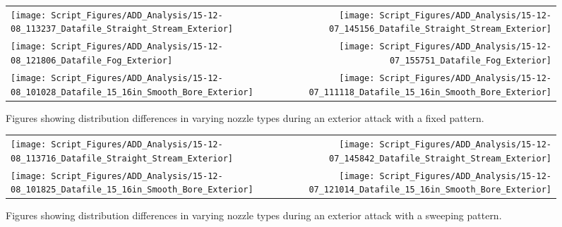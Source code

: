 \documentclass{article}
\begin{document}
\clearpage




\begin{figure}[ht]
\begin{tabular*}{\textwidth}{lr}
\texttt{[image: Script\_Figures/ADD\_Analysis/15-12-08\_113237\_Datafile\_Straight\_Stream\_Exterior]} &
\texttt{[image: Script\_Figures/ADD\_Analysis/15-12-07\_145156\_Datafile\_Straight\_Stream\_Exterior]} \\
\texttt{[image: Script\_Figures/ADD\_Analysis/15-12-08\_121806\_Datafile\_Fog\_Exterior]} &
\texttt{[image: Script\_Figures/ADD\_Analysis/15-12-07\_155751\_Datafile\_Fog\_Exterior]} \\
\texttt{[image: Script\_Figures/ADD\_Analysis/15-12-08\_101028\_Datafile\_15\_16in\_Smooth\_Bore\_Exterior]} & 
\texttt{[image: Script\_Figures/ADD\_Analysis/15-12-07\_111118\_Datafile\_15\_16in\_Smooth\_Bore\_Exterior]} \\
\end{tabular*}
\centering
\caption{Figures showing distribution differences in varying nozzle types during an exterior attack with a fixed pattern.}
\label{fig:Exterior_Varying_Nozzle_Types_Fixed_Pattern}
\end{figure}

\clearpage



\begin{figure}[ht]
\begin{tabular*}{\textwidth}{lr}
\texttt{[image: Script\_Figures/ADD\_Analysis/15-12-08\_113716\_Datafile\_Straight\_Stream\_Exterior]} &
\texttt{[image: Script\_Figures/ADD\_Analysis/15-12-07\_145842\_Datafile\_Straight\_Stream\_Exterior]} \\
\texttt{[image: Script\_Figures/ADD\_Analysis/15-12-08\_101825\_Datafile\_15\_16in\_Smooth\_Bore\_Exterior]} &
\texttt{[image: Script\_Figures/ADD\_Analysis/15-12-07\_121014\_Datafile\_15\_16in\_Smooth\_Bore\_Exterior]} \\
\end{tabular*}
\caption{Figures showing distribution differences in varying nozzle types during an exterior attack with a sweeping pattern.}
\label{fig:Exterior_Varying_Nozzle_Types_Sweeping_Pattern}
\end{figure}
\end{document}
